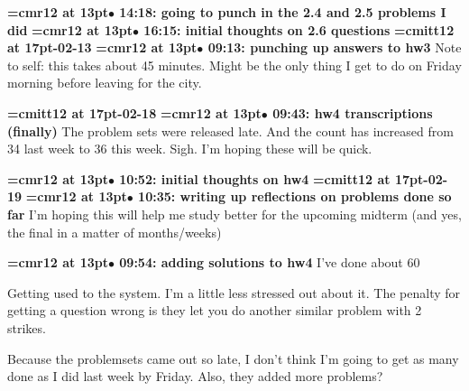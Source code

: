 {\smallskip\noindent\bf\font\titlefont=cmr12 at 13pt\titlefont $\bullet$ 14:18: going to punch in the 2.4 and 2.5 problems I did}\smallskip
{\smallskip\noindent\bf\font\titlefont=cmr12 at 13pt\titlefont $\bullet$ 16:15: initial thoughts on 2.6 questions}\smallskip
{\medskip\noindent\bf\font\titlefont=cmitt12 at 17pt-02-13}\medskip
{\smallskip\noindent\bf\font\titlefont=cmr12 at 13pt\titlefont $\bullet$ 09:13: punching up answers to hw3}\smallskip
Note to self: this takes about 45 minutes. Might be the only thing I get to do on Friday morning before leaving for the city.
\par

{\medskip\noindent\bf\font\titlefont=cmitt12 at 17pt-02-18}\medskip
{\smallskip\noindent\bf\font\titlefont=cmr12 at 13pt\titlefont $\bullet$ 09:43: hw4 transcriptions (finally)}\smallskip
The problem sets were released late. And the count has increased from 34 last week to 36 this week. Sigh. I'm hoping these will be quick.
\par

{\smallskip\noindent\bf\font\titlefont=cmr12 at 13pt\titlefont $\bullet$ 10:52: initial thoughts on hw4}\smallskip
{\medskip\noindent\bf\font\titlefont=cmitt12 at 17pt-02-19}\medskip
{\smallskip\noindent\bf\font\titlefont=cmr12 at 13pt\titlefont $\bullet$ 10:35: writing up reflections on problems done so far}\smallskip
I'm hoping this will help me study better for the upcoming midterm (and yes, the final in a matter of months/weeks)
\par

{\smallskip\noindent\bf\font\titlefont=cmr12 at 13pt\titlefont $\bullet$ 09:54: adding solutions to hw4}\smallskip
I've done about 60%
\par

Getting used to the system. I'm a little less stressed out about it. The penalty for getting a question wrong is they let you do another similar problem with 2 strikes.
\par

Because the problemsets came out so late, I don't think I'm going to get as many done as I did last week by Friday. Also, they added more problems?
\par

